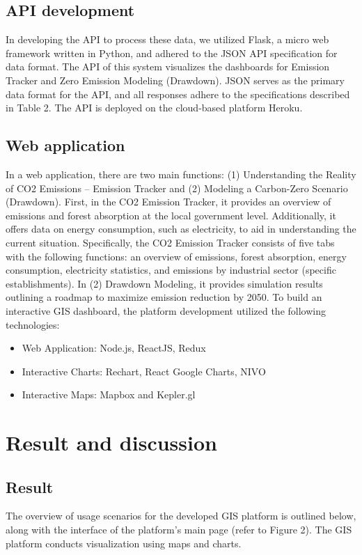 \subsection{API development}
In developing the API to process these data, we utilized Flask, a micro web framework written in Python, and adhered to the JSON API specification for data format. The API of this system visualizes the dashboards for Emission Tracker and Zero Emission Modeling (Drawdown). JSON serves as the primary data format for the API, and all responses adhere to the specifications described in Table 2. The API is deployed on the cloud-based platform Heroku. \par
\subsection{Web application}

In a web application, there are two main functions: (1) Understanding the Reality of CO2 Emissions – Emission Tracker and (2) Modeling a Carbon-Zero Scenario (Drawdown). First, in the CO2 Emission Tracker, it provides an overview of emissions and forest absorption at the local government level. Additionally, it offers data on energy consumption, such as electricity, to aid in understanding the current situation. Specifically, the CO2 Emission Tracker consists of five tabs with the following functions: an overview of emissions, forest absorption, energy consumption, electricity statistics, and emissions by industrial sector (specific establishments). In (2) Drawdown Modeling, it provides simulation results outlining a roadmap to maximize emission reduction by 2050. To build an interactive GIS dashboard, the platform development utilized the following technologies: \par

\begin{itemize}
    \item Web Application: Node.js, ReactJS, Redux
    \item Interactive Charts: Rechart, React Google Charts, NIVO
    \item Interactive Maps: Mapbox and Kepler.gl
\end{itemize}
\section{Result and discussion}
\subsection{Result}
The overview of usage scenarios for the developed GIS platform is outlined below, along with the interface of the platform's main page (refer to Figure 2). The GIS platform conducts visualization using maps and charts.\par

